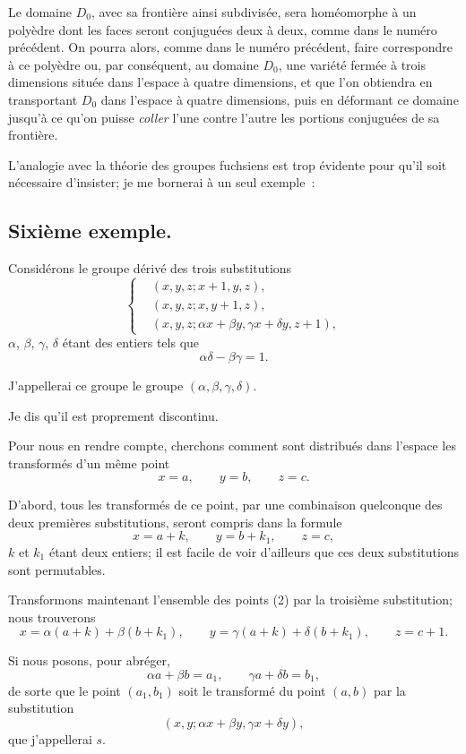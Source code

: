\documentclass{article}
\begin{document}
Le domaine $D_{0}$, avec sa frontière ainsi subdivisée, sera homéomorphe à un polyèdre dont les faces seront conjuguées deux à deux, comme dans le numéro précédent. On pourra alors, comme dans le numéro précédent, faire correspondre à ce polyèdre ou, par conséquent, au domaine $D_{0}$, une variété fermée à trois dimensions située dans l'espace à quatre dimensions, et que l'on obtiendra en transportant $D_{0}$ dans l'espace à quatre dimensions, puis en déformant ce domaine jusqu'à ce qu'on puisse \emph{coller} l'une contre l'autre les portions conjuguées de sa frontière.

L'analogie avec la théorie des groupes fuchsiens est trop évidente pour qu'il soit nécessaire d'insister; je me bornerai à un seul exemple~:

\subsection*{Sixième exemple.}

Considérons le groupe dérivé des trois substitutions
\[ \left\{ \begin{aligned} &(x, y, z; x + 1, y, z),\\ &(x, y, z; x, y + 1, z),\\ &(x, y, z; \alpha x + \beta y, \gamma x + \delta y, z + 1), \end{aligned} \right. \tag{1} \]
$\alpha$, $\beta$, $\gamma$, $\delta$ étant des entiers tels que
\[ \alpha\delta - \beta\gamma = 1. \]

J'appellerai ce groupe le groupe $(\alpha, \beta, \gamma, \delta)$.

Je dis qu'il est proprement discontinu.

Pour nous en rendre compte, cherchons comment sont distribués dans l'espace les transformés d'un même point
\[ x = a, \qquad y = b, \qquad z = c. \]

D'abord, tous les transformés de ce point, par une combinaison quelconque des deux premières substitutions, seront compris dans la formule
\[ x = a + k, \qquad y = b + k_{1}, \qquad z = c, \tag{2} \]
$k$ et $k_{1}$ étant deux entiers; il est facile de voir d'ailleurs que ces deux substitutions sont permutables.

Transformons maintenant l'ensemble des points (2) par la troisième substitution; nous trouverons
\[ x = \alpha(a + k) + \beta(b + k_{1}), \qquad y = \gamma(a + k) + \delta(b + k_{1}), \qquad z = c + 1. \tag{3} \]

Si nous posons, pour abréger,
\[ \alpha a + \beta b = a_{1}, \qquad \gamma a + \delta b = b_{1}, \]
de sorte que le point $(a_{1}, b_{1})$ soit le transformé du point $(a, b)$ par la substitution
\[ (x, y; \alpha x + \beta y, \gamma x + \delta y), \]
que j'appellerai $s$.
\end{document}
